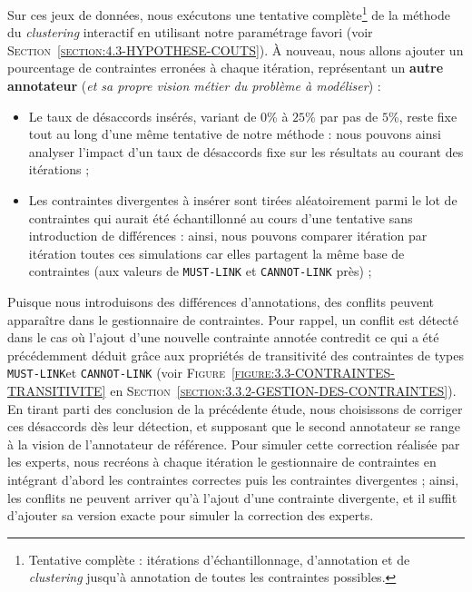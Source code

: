 			Sur ces jeux de données, nous exécutons une tentative complète\footnote{
				Tentative complète : itérations d'échantillonnage, d'annotation et de \textit{clustering} jusqu'à annotation de toutes les contraintes possibles.
			}
			de la méthode du \textit{clustering} interactif en utilisant notre paramétrage favori (voir \textsc{Section~\ref{section:4.3-HYPOTHESE-COUTS}}).
			À nouveau, nous allons ajouter un pourcentage de contraintes erronées à chaque itération, représentant un \textbf{autre annotateur} (\textit{et sa propre vision métier du problème à modéliser}) :
			\begin{itemize}
				\item Le taux de désaccords insérés, variant de $0$\% à $25$\% par pas de $5$\%, reste fixe tout au long d'une même tentative de notre méthode : nous pouvons ainsi analyser l'impact d'un taux de désaccords fixe sur les résultats au courant des itérations ;
				\item Les contraintes divergentes à insérer sont tirées aléatoirement parmi le lot de contraintes qui aurait été échantillonné au cours d'une tentative sans introduction de différences : ainsi, nous pouvons comparer itération par itération toutes ces simulations car elles partagent la même base de contraintes (aux valeurs de \texttt{MUST-LINK} et \texttt{CANNOT-LINK} près) ;
			\end{itemize}
			
			Puisque nous introduisons des différences d'annotations, des conflits peuvent apparaître dans le gestionnaire de contraintes.
			Pour rappel, un conflit est détecté dans le cas où l'ajout d'une nouvelle contrainte annotée contredit ce qui a été précédemment déduit grâce aux propriétés de transitivité des contraintes de types \texttt{MUST-LINK}et \texttt{CANNOT-LINK} (voir \textsc{Figure~\ref{figure:3.3-CONTRAINTES-TRANSITIVITE}} en \textsc{Section~\ref{section:3.3.2-GESTION-DES-CONTRAINTES}}).
			En tirant parti des conclusion de la précédente étude, nous choisissons de corriger ces désaccords dès leur détection, et supposant que le second annotateur se range à la vision de l'annotateur de référence.
			Pour simuler cette correction réalisée par les experts, nous recréons à chaque itération le gestionnaire de contraintes en intégrant d'abord les contraintes correctes puis les contraintes divergentes ; ainsi, les conflits ne peuvent arriver qu'à l'ajout d'une contrainte divergente, et il suffit d'ajouter sa version exacte pour simuler la correction des experts.
			
